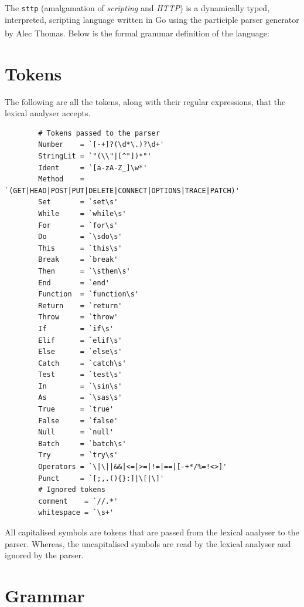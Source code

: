 \documentclass[]{interim}
\theoremstyle{definition}
\begin{document}
The \verb|sttp| (amalgamation of \textit{scripting} and \textit{HTTP}) is a dynamically typed, interpreted, scripting language written in Go using the participle parser generator by Alec Thomas\textsuperscript{\cite{thomas_2021}}. Below is the formal grammar definition of the language:

\section{Tokens}

The following are all the tokens, along with their regular expressions, that the lexical analyser accepts.

\begin{center}
    \begin{verbatim}
        # Tokens passed to the parser
        Number    = `[-+]?(\d*\.)?\d+'
        StringLit = `"(\\"|[^"])*"'
        Ident     = `[a-zA-Z_]\w*'
        Method    = `(GET|HEAD|POST|PUT|DELETE|CONNECT|OPTIONS|TRACE|PATCH)'
        Set       = `set\s'
        While     = `while\s'
        For       = `for\s'
        Do        = `\sdo\s'
        This      = `this\s'
        Break     = `break'
        Then      = `\sthen\s'
        End       = `end'
        Function  = `function\s'
        Return    = `return'
        Throw     = `throw'
        If        = `if\s'
        Elif      = `elif\s'
        Else      = `else\s'
        Catch     = `catch\s'
        Test      = `test\s'
        In        = `\sin\s'
        As        = `\sas\s'
        True      = `true'
        False     = `false'
        Null      = `null'
        Batch     = `batch\s'
        Try       = `try\s'
        Operators = `\|\||&&|<=|>=|!=|==|[-+*/%=!<>]'
        Punct     = `[;,.(){}:]|\[|\]'
        # Ignored tokens
        comment    = `//.*'
        whitespace = `\s+'
    \end{verbatim}
\end{center}

All capitalised symbols are tokens that are passed from the lexical analyser to the parser. Whereas, the uncapitalised symbols are read by the lexical analyser and ignored by the parser.

\section{Grammar}
\end{document}
